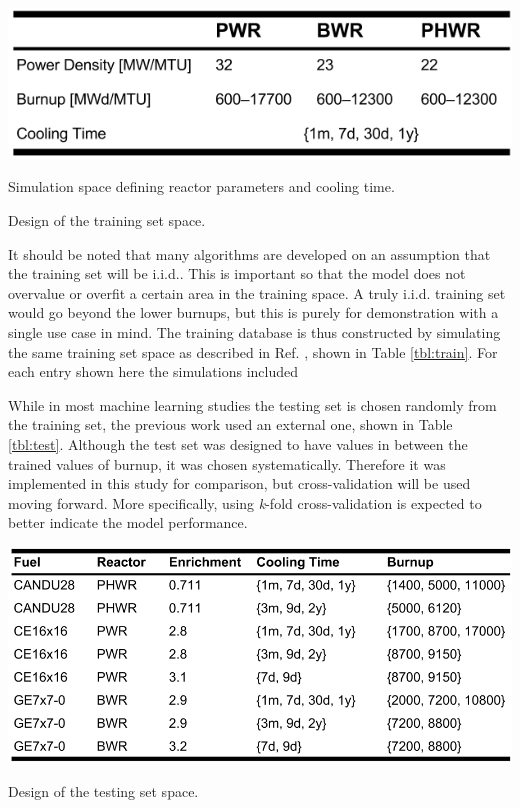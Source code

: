 \begin{table}[H]
  \begin{subtable}{\linewidth}
    \centering
    \includegraphics[width=0.7\linewidth]{./chapters/demo_method/TrainData2.png}
    \caption{Simulation space defining reactor parameters and cooling time.}
    \label{tbl:rxtrparam}
  \end{subtable}%
  \caption{Design of the training set space.}
  \label{tbl:train}
\end{table}

It should be noted that many algorithms are developed on an assumption that the
training set will be \gls{i.i.d.}. This is important so that the model does not
overvalue or overfit a certain area in the training space.  A truly
\gls{i.i.d.} training set would go beyond the lower burnups, but this is purely
for demonstration with a single use case in mind.  The training database is
thus constructed by simulating the same training set space as described in Ref.
\cite{dayman_feasibility_2013}, shown in Table \ref{tbl:train}. For each entry 
shown here the simulations included 

While in most machine learning studies the testing set is chosen randomly from
the training set, the previous work used an external one, shown in Table
\ref{tbl:test}.  Although the test set was designed to have values in between
the trained values of burnup, it was chosen systematically. Therefore it was
implemented in this study for comparison, but cross-validation will be used
moving forward. More specifically, using \textit{k}-fold cross-validation is
expected to better indicate the model performance. 

\begin{table}[H]
  \centering
  \includegraphics[width=0.95\linewidth]{./chapters/demo_method/TestData.png}
  \caption{Design of the testing set space.}
  \label{tbl:test}
\end{table}

